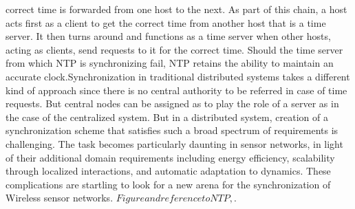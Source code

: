 \documentclass[a4paper,8pt]{report}
\begin{document}
correct time is forwarded from one host to the next. As part of this
chain, a host acts first as a client to get the correct time from
another host that is a time server. It then turns around and
functions as a time server when other hosts, acting as clients, send
requests to it for the correct time. Should the time server from
which NTP is synchronizing fail, NTP retains the ability to maintain
an accurate clock.\newline Synchronization in traditional
distributed systems takes a different kind of approach since there
is no central authority to be referred in case of time requests. But
central nodes can be assigned as to play the role of a server as in
the case of the centralized system.
\newline But in a distributed system, creation of a synchronization scheme that
satisfies such a broad spectrum of requirements is challenging. The
task becomes particularly daunting in sensor networks, in light of
their additional domain requirements including energy efficiency,
scalability through localized interactions, and automatic adaptation
to dynamics. These complications are startling to look for a new
arena for the synchronization of Wireless sensor networks. $Figure
and reference to NTP,$.\newpage
\end{document}
